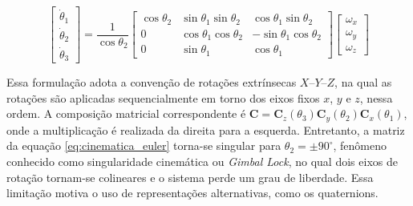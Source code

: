 \begin{equation}
\begin{bmatrix}
\dot{\theta}_1 \\ \dot{\theta}_2 \\ \dot{\theta}_3
\end{bmatrix}
=
\frac{1}{\cos\theta_2}
\begin{bmatrix}
\cos\theta_2 & \sin\theta_1 \sin\theta_2 & \cos\theta_1 \sin\theta_2 \\
0 & \cos\theta_1 \cos\theta_2 & -\sin\theta_1 \cos\theta_2 \\
0 & \sin\theta_1 & \cos\theta_1
\end{bmatrix}
\begin{bmatrix}
\omega_x \\ \omega_y \\ \omega_z
\end{bmatrix}
\label{eq:euler_inversa}
\end{equation}

Essa formulação adota a convenção de rotações extrínsecas $X$--$Y$--$Z$, 
na qual as rotações são aplicadas sequencialmente em torno dos eixos fixos $x$, $y$ e $z$, nessa ordem. 
A composição matricial correspondente é
$\mathbf{C} = \mathbf{C}_z(\theta_3)\mathbf{C}_y(\theta_2)\mathbf{C}_x(\theta_1)$,
onde a multiplicação é realizada da direita para a esquerda.
Entretanto, a matriz da equação \eqref{eq:cinematica_euler} torna-se singular para $\theta_2 = \pm 90^\circ$, fenômeno conhecido como singularidade cinemática ou \textit{Gimbal Lock}, no qual dois eixos de rotação tornam-se colineares e o sistema perde um grau de liberdade.  
Essa limitação motiva o uso de representações alternativas, como os quaternions.
